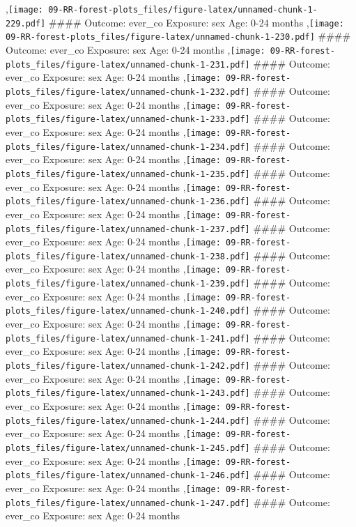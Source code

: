 \documentclass[
  9pt,
]{book}
\begin{document}
,\texttt{[image: 09-RR-forest-plots\_files/figure-latex/unnamed-chunk-1-229.pdf]}
\#\#\#\# Outcome: ever\_co Exposure: sex Age: 0-24 months
,\texttt{[image: 09-RR-forest-plots\_files/figure-latex/unnamed-chunk-1-230.pdf]}
\#\#\#\# Outcome: ever\_co Exposure: sex Age: 0-24 months
,\texttt{[image: 09-RR-forest-plots\_files/figure-latex/unnamed-chunk-1-231.pdf]}
\#\#\#\# Outcome: ever\_co Exposure: sex Age: 0-24 months
,\texttt{[image: 09-RR-forest-plots\_files/figure-latex/unnamed-chunk-1-232.pdf]}
\#\#\#\# Outcome: ever\_co Exposure: sex Age: 0-24 months
,\texttt{[image: 09-RR-forest-plots\_files/figure-latex/unnamed-chunk-1-233.pdf]}
\#\#\#\# Outcome: ever\_co Exposure: sex Age: 0-24 months
,\texttt{[image: 09-RR-forest-plots\_files/figure-latex/unnamed-chunk-1-234.pdf]}
\#\#\#\# Outcome: ever\_co Exposure: sex Age: 0-24 months
,\texttt{[image: 09-RR-forest-plots\_files/figure-latex/unnamed-chunk-1-235.pdf]}
\#\#\#\# Outcome: ever\_co Exposure: sex Age: 0-24 months
,\texttt{[image: 09-RR-forest-plots\_files/figure-latex/unnamed-chunk-1-236.pdf]}
\#\#\#\# Outcome: ever\_co Exposure: sex Age: 0-24 months
,\texttt{[image: 09-RR-forest-plots\_files/figure-latex/unnamed-chunk-1-237.pdf]}
\#\#\#\# Outcome: ever\_co Exposure: sex Age: 0-24 months
,\texttt{[image: 09-RR-forest-plots\_files/figure-latex/unnamed-chunk-1-238.pdf]}
\#\#\#\# Outcome: ever\_co Exposure: sex Age: 0-24 months
,\texttt{[image: 09-RR-forest-plots\_files/figure-latex/unnamed-chunk-1-239.pdf]}
\#\#\#\# Outcome: ever\_co Exposure: sex Age: 0-24 months
,\texttt{[image: 09-RR-forest-plots\_files/figure-latex/unnamed-chunk-1-240.pdf]}
\#\#\#\# Outcome: ever\_co Exposure: sex Age: 0-24 months
,\texttt{[image: 09-RR-forest-plots\_files/figure-latex/unnamed-chunk-1-241.pdf]}
\#\#\#\# Outcome: ever\_co Exposure: sex Age: 0-24 months
,\texttt{[image: 09-RR-forest-plots\_files/figure-latex/unnamed-chunk-1-242.pdf]}
\#\#\#\# Outcome: ever\_co Exposure: sex Age: 0-24 months
,\texttt{[image: 09-RR-forest-plots\_files/figure-latex/unnamed-chunk-1-243.pdf]}
\#\#\#\# Outcome: ever\_co Exposure: sex Age: 0-24 months
,\texttt{[image: 09-RR-forest-plots\_files/figure-latex/unnamed-chunk-1-244.pdf]}
\#\#\#\# Outcome: ever\_co Exposure: sex Age: 0-24 months
,\texttt{[image: 09-RR-forest-plots\_files/figure-latex/unnamed-chunk-1-245.pdf]}
\#\#\#\# Outcome: ever\_co Exposure: sex Age: 0-24 months
,\texttt{[image: 09-RR-forest-plots\_files/figure-latex/unnamed-chunk-1-246.pdf]}
\#\#\#\# Outcome: ever\_co Exposure: sex Age: 0-24 months
,\texttt{[image: 09-RR-forest-plots\_files/figure-latex/unnamed-chunk-1-247.pdf]}
\#\#\#\# Outcome: ever\_co Exposure: sex Age: 0-24 months
\end{document}
